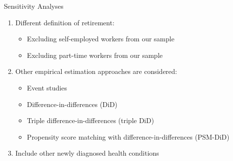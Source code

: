 \documentclass{beamer}
\begin{document}
\begin{frame}{Sensitivity Analyses}
\begin{enumerate}
        
       \item<8-> Different  \begingroup\color{Blue}definition of retirement\endgroup:
        \begin{itemize}
        \scriptsize
            \item<9-> Excluding  \begingroup\color{Blue}self-employed  \endgroup workers from our sample
            \item<10-> Excluding  \begingroup\color{Blue}part-time  \endgroup workers from our sample
        \end{itemize}
        \item<11-> Other  \begingroup\color{Blue}empirical estimation  \endgroup approaches are considered:
        \begin{itemize}
        \scriptsize
            \item<12-> Event studies
            \item<13-> Difference-in-differences (DiD)
            \item<14-> Triple difference-in-differences (triple DiD)
            \item<15-> Propensity score matching with difference-in-differences (PSM-DiD)
        \end{itemize}
        \item<16-> Include other \begingroup\color{Blue}newly diagnosed health \endgroup conditions 
        
    \end{enumerate}    
\end{frame}
\end{document}
